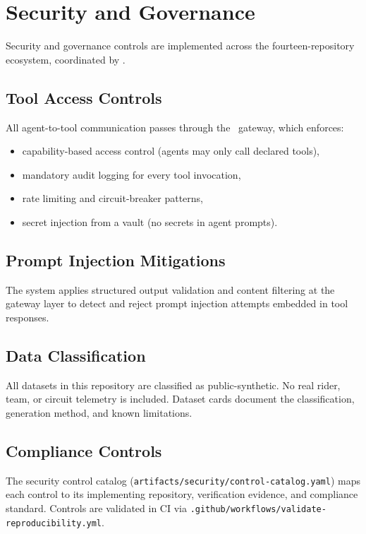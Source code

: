 \section{Security and Governance}
\label{sec:security-governance}

Security and governance controls are implemented across the fourteen-repository
ecosystem, coordinated by .

\subsection{Tool Access Controls}

All agent-to-tool communication passes through the \mcp~gateway, which enforces:

\begin{itemize}
  \item capability-based access control (agents may only call declared tools),
  \item mandatory audit logging for every tool invocation,
  \item rate limiting and circuit-breaker patterns,
  \item secret injection from a vault (no secrets in agent prompts).
\end{itemize}

\subsection{Prompt Injection Mitigations}

The system applies structured output validation and content filtering at the
gateway layer to detect and reject prompt injection attempts embedded in
tool responses.

\subsection{Data Classification}

All datasets in this repository are classified as public-synthetic. No real
rider, team, or circuit telemetry is included. Dataset cards document the
classification, generation method, and known limitations.

\subsection{Compliance Controls}

The security control catalog (\texttt{artifacts/security/control-catalog.yaml})
maps each control to its implementing repository, verification evidence, and
compliance standard. Controls are validated in CI via
\texttt{.github/workflows/validate-reproducibility.yml}.
